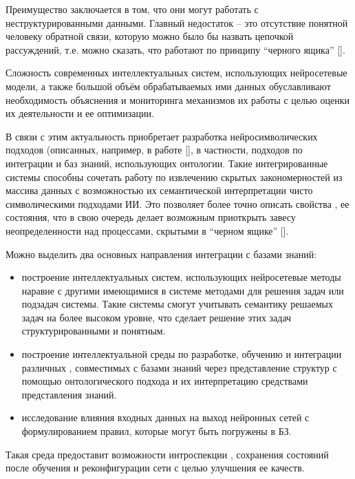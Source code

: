 Преимущество  заключается в том, что они могут работать с неструктурированными данными.
Главный недостаток  -- это отсутствие понятной человеку обратной связи, которую можно было бы назвать цепочкой
рассуждений, т.е. можно сказать, что  работают по принципу ``черного ящика'' [].

Сложность современных интеллектуальных систем, использующих нейросетевые модели, а также большой объём обрабатываемых ими данных обуславливают необходимость объяснения и мониторинга механизмов их работы с целью оценки их деятельности и ее оптимизации.

В связи с этим актуальность приобретает разработка нейросимволических подходов (описанных, например, в работе [], в частности, подходов по интеграции  и баз знаний, использующих онтологии. Такие интегрированные системы способны сочетать работу  по извлечению скрытых закономерностей из массива данных с возможностью их семантической интерпретации чисто символическими подходами ИИ. Это позволяет более точно описать свойства , ее состояния, что в свою очередь делает возможным приоткрыть завесу неопределенности над процессами, скрытыми в ``черном ящике'' [].

Можно выделить два основных направления интеграции  с базами знаний:

\begin{itemize}
	\item построение интеллектуальных систем, использующих нейросетевые методы наравне с другими имеющимися в системе методами для решения задач или подзадач системы. Такие системы смогут учитывать семантику решаемых задач на более высоком уровне, что сделает решение этих задач структурированными и понятным.

	\item построение интеллектуальной среды по разработке, обучению и интеграции различных , совместимых с базами знаний через представление структур  с помощью онтологического подхода и их интерпретацию средствами представления знаний.
	
	\item исследование влияния входных данных на выход нейронных сетей с формулированием правил, которые могут быть погружены в БЗ.
\end{itemize}

Такая среда предоставит возможности интроспекции , сохранения состояний  после обучения и реконфигурации сети с целью улучшения ее качеств.

